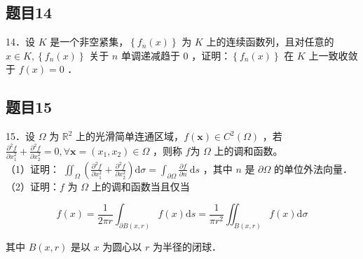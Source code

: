 \documentclass{article}
\begin{document}
\subsection{题目14}
14．设 \(K\) 是一个非空紧集，\(\left\{f_{n}(x)\right\}\) 为 \(K\) 上的连续函数列，且对任意的 \(x \in K,\left\{f_{n}(x)\right\}\) 关于 \(n\) 单调递减趋于 0 ，证明：\(\left\{f_{n}(x)\right\}\) 在 \(K\) 上一致收敛于 \(f(x)=0\) ．

\subsection{题目15}
15．设 \(\Omega\) 为 \(\mathbb{R}^{2}\) 上的光滑简单连通区域，\(f(\mathbf{x}) \in C^{2}(\Omega)\) ，若 \(\frac{\partial^{2} f}{\partial x_{1}^{2}}+\frac{\partial^{2} f}{\partial x_{2}^{2}}=0, \forall \mathbf{x}=\left(x_{1}, x_{2}\right) \in \Omega\) ，则称 \(f\)为 \(\Omega\) 上的调和函数。\\
（1）证明： \(\iint_{\Omega}\left(\frac{\partial^{2} f}{\partial x_{1}^{2}}+\frac{\partial^{2} f}{\partial x_{2}^{2}}\right) \mathrm{d} \sigma=\int_{\partial \Omega} \frac{\partial f}{\partial n} \mathrm{~d} s\) ，其中 \(n\) 是 \(\partial \Omega\) 的单位外法向量．\\
（2）证明：\(f\) 为 \(\Omega\) 上的调和函数当且仅当

\[
f(x)=\frac{1}{2 \pi r} \int_{\partial B(x, r)} f(x) \mathrm{d} s=\frac{1}{\pi r^{2}} \iint_{B(x, r)} f(x) \mathrm{d} \sigma
\]

其中 \(B(x, r)\) 是以 \(x\) 为圆心以 \(r\) 为半径的闭球．
\end{document}
